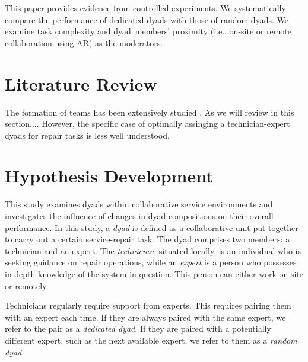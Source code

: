 \documentclass[msom,nonblindrev]{01 latex/class/informs3}
\begin{document}
This paper provides evidence from controlled experiments. We systematically compare the performance of dedicated dyads with those of random dyads. We examine task complexity and dyad\ members' proximity (i.e., on-site or remote collaboration using AR) as the moderators.


\section{Literature Review}
The formation of teams has been extensively studied \citep{guzzo1996teams}. As we will review in this section.... However, the specific case of optimally assinging a technician-expert dyads for repair tasks is less well understood.



\section{Hypothesis Development}
This study examines dyads within collaborative service environments and investigates the influence of changes in dyad compositions on their overall performance. In this study, a \emph{dyad} is defined as a collaborative unit put together to carry out a certain service-repair task. The dyad comprises two members: a technician and an expert. The \emph{technician}, situated locally, is an individual who is seeking guidance on repair operations, while an \emph{expert} is a person who possesses in-depth knowledge of the system in question. This person can either work on-site or remotely.

Technicians regularly require support from experts. This requires pairing them with an expert each time. If they are always paired with the same expert, we refer to the pair as a \emph{dedicated dyad}. If they are paired with a potentially different expert, such as the next available expert, we refer to them as a \emph{random dyad}. 
\end{document}
